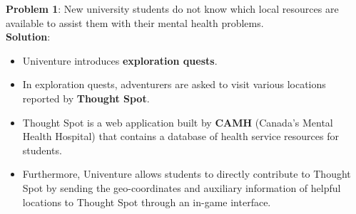 \documentclass[landscape,archE,fontscale=0.29]{baposter} %
\newcommand{\compresslist}{ %
\setlength{\itemsep}{1pt}
\setlength{\parskip}{0pt}
\setlength{\parsep}{0pt}
}
\newcommand{\myv}{\vspace{-1mm}}
\begin{document}
\begin{poster}
{  \begin{minipage}{0.72\linewidth}
    \textbf{Problem 1}: New university students do not know which local resources are available to assist them with their mental health problems.
    \\
    \textbf{Solution}:
    \myv \myv
    \begin{itemize} \compresslist
    \item Univenture introduces \textbf{exploration quests}.
    \item In exploration quests, adventurers are asked to visit various locations reported by \textbf{Thought Spot}.
    \item Thought Spot is a web application built by \textbf{CAMH} (Canada's Mental Health Hospital) that contains a database of health service resources for students.
    \item Furthermore, Univenture allows students to directly contribute to Thought Spot by sending the geo-coordinates and auxiliary information of helpful locations to Thought Spot through an in-game interface.
    \end{itemize}
  \end{minipage}

}
\end{poster}
\end{document}

